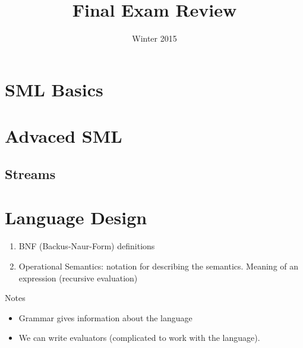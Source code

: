 \documentclass[10pt,twoside]{article}
\title{\textbf{\doctitle}\\
Final Exam Review}
\date{Winter 2015}
\begin{document}
\thispagestyle{empty}

\maketitle

\section{SML Basics}

\section{Advaced SML}
\subsection{Streams}

\section{Language Design}

\begin{enumerate}
\item BNF (Backus-Naur-Form) definitions
\item Operational Semantics: notation for describing the semantics. Meaning of an expression (recursive evaluation)
\end{enumerate}

Notes
\begin{itemize}
\item Grammar gives information about the language
\item We can write evaluators (complicated to work with the language). 
\end{itemize}
\end{document}
